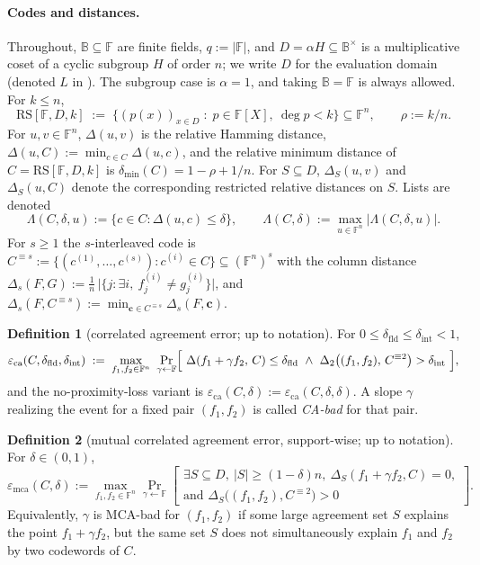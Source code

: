 \documentclass[11pt]{article}
\theoremstyle{definition}
\newtheorem{definition}[definition]{Definition}
\theoremstyle{remark}
\newcommand{\F}{\mathbb{F}}
\newcommand{\B}{\mathbb{B}}
\newcommand{\RS}{\mathrm{RS}}
\newcommand{\eca}{\varepsilon_{\mathrm{ca}}}
\newcommand{\emca}{\varepsilon_{\mathrm{mca}}}
\newcommand{\dmin}{\delta_{\min}}
\newcommand{\dist}{\Delta}
\newcommand{\distS}{\Delta_S}
\newcommand{\Lst}{\Lambda}
\begin{document}
\paragraph{Codes and distances.} Throughout, $\B\subseteq\F$ are finite fields, $q:=|\F|$, and $D=\alpha H\subseteq\B^\times$ is a multiplicative coset of a cyclic subgroup $H$ of order $n$; we write $D$ for the evaluation domain (denoted $L$ in \cite{ABF26}). The subgroup case is $\alpha=1$, and taking $\B=\F$ is always allowed. For $k\le n$,
\[
\RS[\F,D,k]\;:=\;\bigl\{(p(x))_{x\in D}\;:\;p\in\F[X],\ \deg p<k\bigr\}\subseteq\F^n,
\qquad \rho:=k/n .
\]
For $u,v\in\F^n$, $\dist(u,v)$ is the relative Hamming distance, $\dist(u,C):=\min_{c\in C}\dist(u,c)$, and the relative minimum distance of $C=\RS[\F,D,k]$ is $\dmin(C)=1-\rho+1/n$. For $S\subseteq D$, $\distS(u,v)$ and $\distS(u,C)$ denote the corresponding restricted relative distances on $S$. Lists are denoted
\[
\Lst(C,\delta,u):=\{c\in C:\dist(u,c)\le\delta\},\qquad \Lst(C,\delta):=\max_{u\in\F^n}|\Lst(C,\delta,u)| .
\]
For $s\ge1$ the $s$-interleaved code is $C^{\equiv s}:=\{(c^{(1)},\dots,c^{(s)}):c^{(i)}\in C\}\subseteq(\F^n)^s$ with the column distance $\dist_s(F,G):=\frac1n\,\bigl|\{j:\exists i,\ f^{(i)}_j\ne g^{(i)}_j\}\bigr|$, and $\dist_s(F,C^{\equiv s}):=\min_{\mathbf c\in C^{\equiv s}}\dist_s(F,\mathbf c)$.

\begin{definition}[correlated agreement error; {\cite[Def.~4.1]{ABF26}} up to notation]\label{def:ca}
For $0\le\delta_{\mathrm{fld}}\le\delta_{\mathrm{int}}<1$,
\[
\eca(C,\delta_{\mathrm{fld}},\delta_{\mathrm{int}})\;:=\;\max_{f_1,f_2\in\F^n}\ \Pr_{\gamma\leftarrow\F}\Bigl[\ \dist(f_1+\gamma f_2,\,C)\le\delta_{\mathrm{fld}}\ \wedge\ \dist_2\bigl((f_1,f_2),\,C^{\equiv2}\bigr)>\delta_{\mathrm{int}}\ \Bigr],
\]
and the no-proximity-loss variant is $\eca(C,\delta):=\eca(C,\delta,\delta)$. A slope $\gamma$ realizing the event for a fixed pair $(f_1,f_2)$ is called \emph{CA-bad} for that pair.
\end{definition}

\begin{definition}[mutual correlated agreement error, support-wise; {\cite[Def.~4.3]{ABF26}} up to notation]\label{def:mca}
For $\delta\in(0,1)$,
\[
\emca(C,\delta):=\max_{f_1,f_2\in\F^n}\Pr_{\gamma\leftarrow\F}\left[
\begin{array}{l}
\exists S\subseteq D,\ |S|\ge(1-\delta)n,\ \distS(f_1+\gamma f_2,C)=0,\\[2pt]
\text{and }\distS\bigl((f_1,f_2),C^{\equiv2}\bigr)>0
\end{array}
\right].
\]
Equivalently, $\gamma$ is MCA-bad for $(f_1,f_2)$ if some large agreement set $S$ explains the point $f_1+\gamma f_2$, but the same set $S$ does not simultaneously explain $f_1$ and $f_2$ by two codewords of $C$.
\end{definition}
\end{document}
